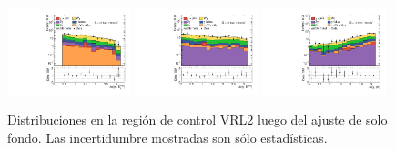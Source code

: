 \begin{figure}[ht!]
\begin{center}
    \includegraphics[width=0.32\textwidth]{images_tmp/results/fr2/can_VRL2_dphi_jetmet_afterFit.pdf}
    \includegraphics[width=0.32\textwidth]{images_tmp/results/fr2/can_VRL2_dphi_gammet_afterFit.pdf}
    \includegraphics[width=0.32\textwidth]{images_tmp/results/fr2/can_VRL2_dphi_gamjet_afterFit.pdf}

    \caption{Distribuciones en la región de control VRL2 luego del ajuste de solo fondo. Las incertidumbre mostradas son sólo estadísticas.}
    \label{fig:dist_vrl2_bkgonly}
  \end{center}
\end{figure}

